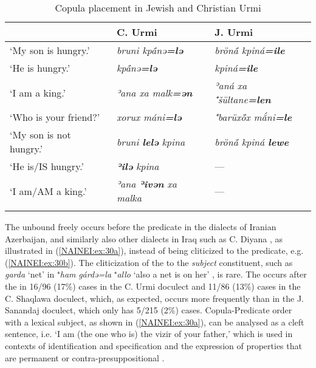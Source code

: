 \documentclass[output=paper,colorlinks,citecolor=brown,draftmode]{langscibook}
\begin{document}
\begin{table}
        \begin{tabularx}{\textwidth}{XXl}
\lsptoprule
 & \textbf{C. Urmi} & \textbf{J. Urmi} \\
\midrule
`My son is hungry.' & \textit{bruni kpā́nə\textbf{=lə}} & \textit{brönā́ kpiná\textbf{=ile}} \\
`He is hungry.' & \textit{kpā́nə\textbf{=lə}}  & \textit{kpiná\textbf{=ile}} \\
`I am a king.' & \textit{ʾana xa malk\textbf{=ən}} & \textit{ʾaná xa ⁺šültane\textbf{=len}} \\
`Who is your friend?'  & \textit{xorux máni\textbf{=lə}} & \textit{⁺barüxö́x mắni\textbf{=le}} \\
`My son is not hungry.' & \textit{bruni \textbf{lelə} kpina} & \textit{brönā́ kpiná \textbf{lewe}} \\
`He is/IS hungry.' & \textit{\textbf{ʾilə} kpina} & --- \\
`I am/AM a king.' & \textit{ʾana \textbf{ʾivən} xa malka} & --- \\
\lspbottomrule
    \end{tabularx}
    \caption{Copula placement in Jewish and Christian Urmi}
    \label{NAINEI:tab:7}
\end{table}

The unbound  freely occurs before the predicate in the dialects of Iranian Azerbaijan, and similarly also other dialects in Iraq such as C. Diyana \parencite{Napiorkowska2015DiyanaZ}, as illustrated in (\ref{NAINEI:ex:30a}), instead of being cliticized to the predicate, e.g. (\ref{NAINEI:ex:30b}). The cliticization of the  to the \textit{subject} constituent, such as \textit{garda} `net' in ⁺\textit{ham} \textit{gárdə=la} ⁺\textit{allo} `also a net is on her' \parencite[II: 289]{Khan2016CUrmi}, is rare. The  occurs after the  in 16/96 (17\%) cases in the C. Urmi doculect and 11/86 (13\%) cases in the C. Shaqlawa doculect, which, as expected, occurs more frequently than in the J. Sanandaj doculect, which only has 5/215 (2\%) cases. Copula-Predicate order with a lexical subject, as shown in (\ref{NAINEI:ex:30a}), can be analysed as a cleft sentence, i.e. `I am (the one who is) the vizir of your father,' which is used in contexts of identification and specification and the expression of properties that are permanent or contra-presuppositional \parencite[II: 158--162]{Khan2016CUrmi}. 
\end{document}
